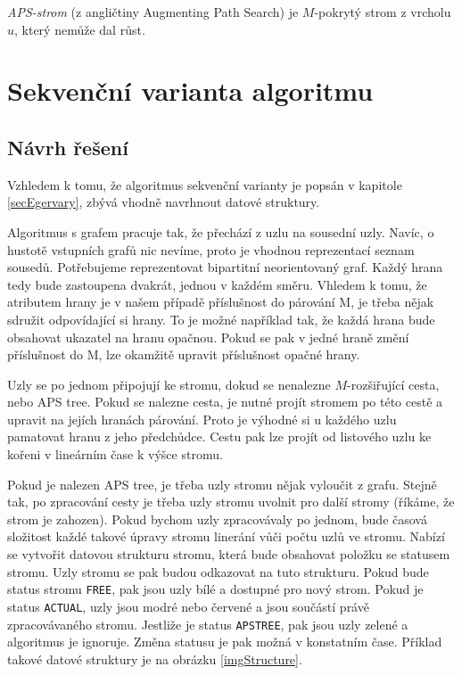 \documentclass[a4paper, 11pt, titlepage, final]{article}[3. prosinec 2011]
\begin{document}
\begin{Definice}
\textit{APS-strom} (z angličtiny Augmenting Path Search) je $M$-pokrytý strom z vrcholu $u$, který nemůže dal růst.
\end{Definice}

\section{Sekvenční varianta algoritmu}

\subsection{Návrh řešení}

Vzhledem k tomu, že algoritmus sekvenční varianty je popsán v kapitole \ref{secEgervary}, zbývá vhodně navrhnout datové struktury. 

Algoritmus s grafem pracuje tak, že přechází z uzlu na sousední uzly. Navíc, o hustotě vstupních grafů nic nevíme, proto je vhodnou reprezentací seznam sousedů. Potřebujeme reprezentovat bipartitní neorientovaný graf. Každý hrana tedy bude zastoupena dvakrát, jednou v každém směru. Vhledem k tomu, že atributem hrany je v našem případě příslušnost do párování M, je třeba nějak sdružit odpovídající si hrany. To je možné například tak, že každá hrana bude obsahovat ukazatel na hranu opačnou. Pokud se pak v jedné hraně změní příslušnost do M, lze okamžitě upravit příslušnost opačné hrany.

Uzly se po jednom připojují ke stromu, dokud se nenalezne $M$-rozšiřující cesta, nebo APS tree. Pokud se nalezne cesta, je nutné projít stromem po této cestě a upravit na jejích hranách párování. Proto je výhodné si u každého uzlu pamatovat hranu z jeho předchůdce. Cestu pak lze projít od listového uzlu ke kořeni v lineárním čase k výšce stromu. 

Pokud je nalezen APS tree, je třeba uzly stromu nějak vyloučit z grafu. Stejně tak, po zpracování cesty je třeba uzly stromu uvolnit pro další stromy (říkáme, že strom je zahozen). Pokud bychom uzly zpracovávaly po jednom, bude časová složitost každé takové úpravy stromu linerání vůči počtu uzlů ve stromu. Nabízí se vytvořit datovou strukturu stromu, která bude obsahovat položku se statusem stromu. Uzly stromu se pak budou odkazovat na tuto strukturu. Pokud bude status stromu \texttt{FREE}, pak jsou uzly bílé a dostupné pro nový strom. Pokud je status \texttt{ACTUAL}, uzly jsou modré nebo červené a jsou součástí právě zpracovávaného stromu. Jestliže je status \texttt{APSTREE}, pak jsou uzly zelené a algoritmus je ignoruje. Změna statusu je pak možná v konstatním čase. Příklad takové datové struktury je na obrázku \ref{imgStructure}.
\end{document}
